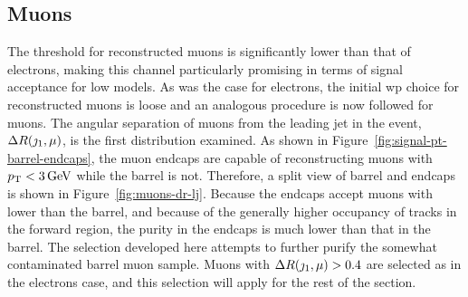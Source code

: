 \clearpage

\subsection{Muons}
\label{sec:muon-selection}

The \pt threshold for reconstructed muons is significantly lower than that of electrons, making this channel particularly promising in terms of signal acceptance for low \dm models. As was the case for electrons, the initial \gls{wp} choice for reconstructed muons is loose and an analogous procedure is now followed for muons. The angular separation of muons from the leading jet in the event, $\Delta R(\jmath_1,\mu)$, is the first distribution examined. As shown in Figure~\ref{fig:signal-pt-barrel-endcaps}, the muon endcaps are capable of reconstructing muons with $p_{\mathrm{T}}<3\,\text{Ge\hspace{-.08em}V}$ while the barrel is not. Therefore, a split view of barrel and endcaps is shown in Figure~\ref{fig:muons-dr-lj}. Because the endcaps accept muons with lower \pt than the barrel, and because of the generally higher occupancy of tracks in the forward region, the purity in the endcaps is much lower than that in the barrel. The selection developed here attempts to further purify the somewhat contaminated barrel muon sample. Muons with $\Delta R(\jmath_1,\mu)>0.4$ are selected as in the electrons case, and this selection will apply for the rest of the section.

